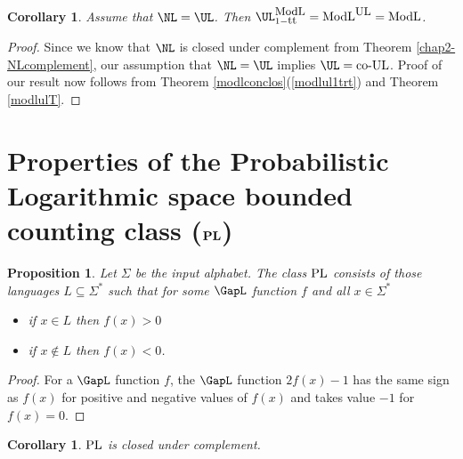 \documentclass{amsbook}
\newtheorem{corollary}[theorem]{Corollary}
\newtheorem{proposition}[theorem]{Proposition}
\theoremstyle{definition}
\theoremstyle{remark}
\numberwithin{section}{chapter}
\numberwithin{equation}{chapter}
\newcommand{\coUL}{\mbox{\rm co-UL}}
\newcommand{\ULredn}{\mbox{\small{\rm UL}}}
\renewcommand{\PL}{\mbox{\rm PL}}
\newcommand{\boldPL}{\mbox{\rm \bf PL}}
\newcommand{\ModL}{\mbox{\rm ModL}}
\newcommand{\ModLredn}{\mbox{\small{\rm ModL}}}
\newcommand{\trt}{\mbox{\small{\rm tt}}}
\begin{document}
\begin{corollary}\label{modlulmodl}
Assume that $\NL =\UL$. Then $\UL ^{\ModLredn}_{1-\trt}=\ModL ^{\ULredn}=\ModL$.
\end{corollary}
\begin{proof}
Since we know that $\NL$ is closed under complement from Theorem \ref{chap2-NLcomplement}, our assumption that $\NL =\UL$ implies $\UL =\coUL$. Proof of our result now follows from Theorem \ref{modlconclos}(\ref{modlul1trt}) and Theorem \ref{modlulT}.
\end{proof}

\section{Properties of the Probabilistic Logarithmic space bounded counting class ($\boldPL$)}
\begin{proposition}\label{characterizePL}
Let $\Sigma$ be the input alphabet. The class $\PL$ consists of those languages $L\subseteq\Sigma^*$ such that for some $\GapL$ function $f$ and all $x\in\Sigma^*$
\begin{itemize}
\item if $x\in L$ then $f(x)>0$
\item if $x\not\in L$ then $f(x)<0$.
\end{itemize}
\end{proposition}
\begin{proof}
For a $\GapL$ function $f$, the $\GapL$ function $2f(x)-1$ has the same sign as $f(x)$ for positive and negative values of $f(x)$ and takes value $-1$ for $f(x)=0$.
\end{proof}

\begin{corollary}\label{plclosurecomplement}
$\PL$ is closed under complement.
\end{corollary}
\end{document}
